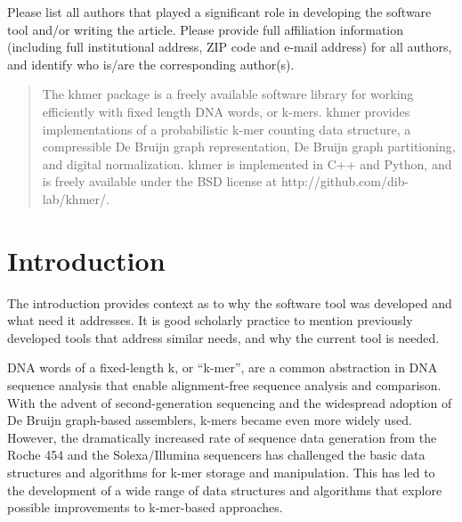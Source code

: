 \documentclass[10pt,a4paper,twocolumn]{article}
\begin{document}

\maketitle
\thispagestyle{fancy}

Please list all authors that played a significant role in developing the software tool and/or writing the article. Please provide full affiliation information (including full institutional address, ZIP code and e-mail address) for all authors, and identify who is/are the corresponding author(s).

\begin{abstract}

The khmer package is a freely available software library for working efficiently with fixed length DNA words, or k-mers.  khmer provides implementations of a probabilistic k-mer counting data structure, a compressible De Bruijn graph representation, De Bruijn graph
partitioning, and digital normalization.  khmer is implemented in C++ and Python, and is freely available under the BSD license at http://github.com/dib-lab/khmer/.

\end{abstract}
\clearpage

\section*{Introduction}

The introduction provides context as to why the software tool was developed and what need it addresses.  It is good scholarly practice to mention previously developed tools that address similar needs, and why the current tool is needed. 

DNA words of a fixed-length k, or ``k-mer'', are a common abstraction
in DNA sequence analysis that enable alignment-free sequence analysis
and comparison. With the advent of second-generation
sequencing and the widespread adoption of De Bruijn graph-based
assemblers, k-mers became even more widely used.  However, the
dramatically increased rate of sequence data generation from the Roche
454 and the Solexa/Illumina sequencers has challenged the basic
data structures and algorithms for k-mer storage and manipulation.
This has led to the development of a wide range of data structures and
algorithms that explore possible improvements to k-mer-based
approaches.
\end{document}
